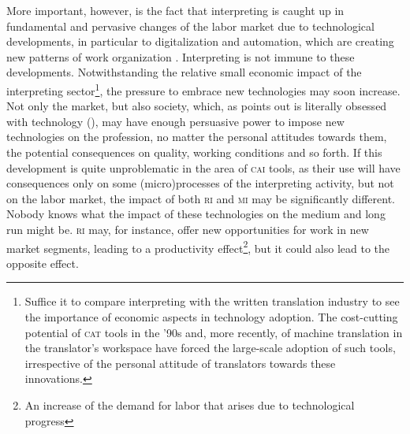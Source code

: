 \documentclass[output=paper]{langsci/langscibook}
\begin{document}
More important, however, is the fact that interpreting is caught up in fundamental and pervasive changes of the labor market due to technological developments, in particular to digitalization and automation, which are creating new patterns of work organization \citep{ursula_huws_logged_2016, neufeind_work_2018}. Interpreting is not immune to these developments. Notwithstanding the relative small economic impact of the interpreting sector\footnote{Suffice it to compare interpreting with the written translation industry to see the importance of economic aspects in technology adoption. The cost-cutting potential of \textsc{cat} tools in the ’90s and, more recently, of machine translation in the translator’s workspace have forced the large-scale adoption of such tools, irrespective of the personal attitude of translators towards these innovations.}, the pressure to embrace new technologies may soon increase. Not only the market, but also society, which, as \citeauthor{besnier_homme_2012} points out is literally obsessed with technology (\citeyear{besnier_homme_2012}), may have enough persuasive power to impose new technologies on the profession, no matter the personal attitudes towards them, the potential consequences on quality, working conditions and so forth. If this development is quite unproblematic in the area of \textsc{cai} tools, as their use will have consequences only on some (micro)processes of the interpreting activity, but not on the labor market, the impact of both \textsc{ri} and \textsc{mi} may be significantly different. Nobody knows what the impact of these technologies on the medium and long run might be. \textsc{ri} may, for instance, offer new opportunities for work in new market segments, leading to a productivity effect\footnote{An increase of the demand for labor that arises due to technological progress}, but it could also lead to the opposite effect. 
\end{document}
